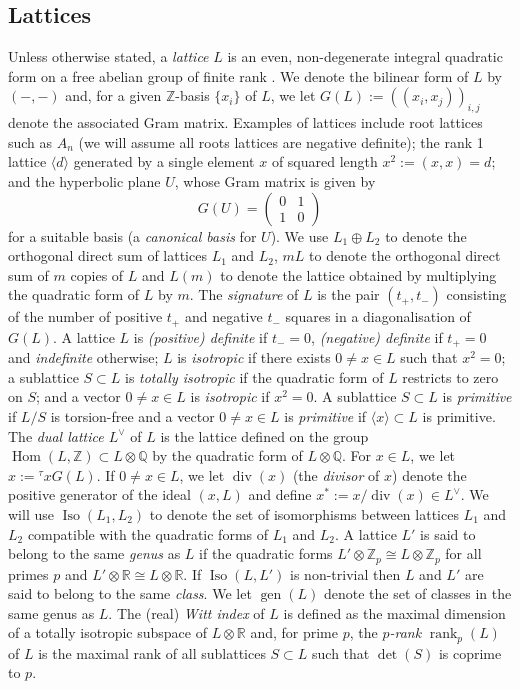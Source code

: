 \documentclass[12pt, a4paper]{article}
\newcommand{\RR}{\mathbb{R}}
\newcommand{\ZZ}{\mathbb{Z}}
\newcommand{\QQ}{\mathbb{Q}}
\newcommand{\la}{\langle}
\newcommand{\ra}{\rangle}
\newcommand{\opn}{\operatorname}
\newcommand{\op}{\oplus}
\newcommand{\bpm}{\begin{pmatrix}}
\newcommand{\epm}{\end{pmatrix}}
\begin{document}
\subsection{Lattices}
Unless otherwise stated, a \emph{lattice} $L$ is an even, non-degenerate integral quadratic form on a free abelian group of finite rank \cite{Nikulin, SPLAG}.
We denote the bilinear form of $L$ by $(-,-)$ and, for a given $\ZZ$-basis $\{x_i \}$ of $L$, we let $G(L):=((x_i, x_j))_{i, j}$ denote the associated Gram matrix.
Examples of lattices include root lattices such as $A_n$ (we will assume all roots lattices are negative definite);
the rank 1 lattice $\la d \ra$ generated by a single element $x$ of squared length $x^2 := (x,x)=d$;
and the hyperbolic plane $U$, whose Gram matrix is given by
\begin{equation}\label{ugram}
G(U) = \bpm 0 & 1 \\ 1 & 0 \epm
\end{equation}
for a suitable basis (a \emph{canonical basis} for $U$).
We use $L_1 \op L_2$ to denote the orthogonal direct sum of lattices $L_1$ and $L_2$,
$mL$ to denote the orthogonal direct sum of $m$ copies of $L$
and $L(m)$ to denote the lattice obtained by multiplying the quadratic form of $L$ by $m$.
The \emph{signature} of $L$ is the pair $(t_+, t_-)$ consisting of the number of positive $t_+$ and negative $t_-$ squares in a diagonalisation of $G(L)$.
A lattice $L$ is  
\emph{(positive) definite} if $t_-=0$,
\emph{(negative) definite} if $t_+ = 0$
and \emph{indefinite} otherwise;   
$L$ is \emph{isotropic} if there exists $0 \neq x \in L$ such that $x^2=0$;  
a sublattice $S \subset L$ is \emph{totally isotropic} if the quadratic form of $L$ restricts to zero on $S$;
and a vector $0 \neq x \in L$ is \emph{isotropic} if $x^2 = 0$.
A sublattice $S \subset L$ is \emph{primitive} if $L/S$ is torsion-free and a vector $0 \neq x \in L$ is \emph{primitive} if  $\la x \ra \subset L$ is primitive.
The \emph{dual lattice $L^{\vee}$} of $L$ is the lattice defined on the group $\opn{Hom}(L, \ZZ) \subset L \otimes \QQ$ by the quadratic form of $L \otimes \QQ$.
For $x \in L$, we let $\hat{x}:={}^{\tau}xG(L)$. 
If $0 \neq x \in L$, we let  $\opn{div}(x)$ (the \emph{divisor} of $x$) denote the positive generator of the ideal $(x, L)$ and define $x^*:=x/\opn{div}(x) \in L^{\vee}$.
We will use $\opn{Iso}(L_1, L_2)$ to denote the set of isomorphisms between lattices $L_1$ and $L_2$ compatible with the quadratic forms of $L_1$ and $L_2$.
A lattice $L'$ is said to belong to the same \emph{genus} as $L$ if the quadratic forms $L' \otimes \ZZ_p \cong L \otimes \ZZ_p$ for all primes $p$ and $L' \otimes \RR \cong L \otimes \RR$.
If $\opn{Iso}(L, L')$ is non-trivial then $L$ and $L'$ are said to belong to the same \emph{class}.
We let $\opn{gen}(L)$ denote the set of classes in the same genus as $L$.
The (real) \emph{Witt index} of $L$ is defined as the maximal dimension of a totally isotropic subspace of $L \otimes \RR$ and, for prime $p$, the \emph{$p$-rank} $\opn{rank}_p(L)$ of $L$ is the maximal rank of all sublattices $S \subset L$ such that $\opn{det}(S)$ is coprime to $p$.
\end{document}
